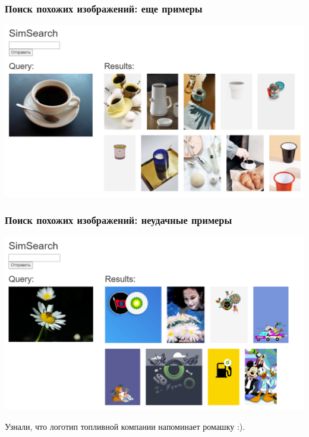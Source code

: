 \documentclass{beamer}
\begin{document}
\begin{frame}
\frametitle{Поиск похожих изображений: еще примеры}


\begin{center}
\includegraphics[width=\linewidth]{img/simsearch_coffee.png}
\end{center}


\end{frame}

\begin{frame}
\frametitle{Поиск похожих изображений: неудачные примеры}


\begin{center}
\includegraphics[width=\linewidth]{img/simsearch_daisy.png}
\end{center}

Узнали, что логотип топливной компании напоминает ромашку :).

\end{frame}
\end{document}
